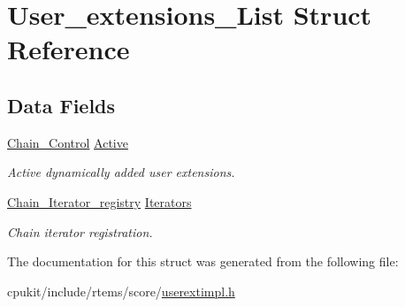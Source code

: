 \hypertarget{structUser__extensions__List}{}\section{User\+\_\+extensions\+\_\+\+List Struct Reference}
\label{structUser__extensions__List}
\subsection*{Data Fields}
\begin{DoxyCompactItemize}
\item 
\mbox{\label{structUser__extensions__List_ad35c5e947d08ba31bc1f32c656ab368f}} 
\mbox{\hyperlink{unionChain__Control}{Chain\+\_\+\+Control}} \mbox{\hyperlink{structUser__extensions__List_ad35c5e947d08ba31bc1f32c656ab368f}{Active}}
\begin{DoxyCompactList}\small\item\em Active dynamically added user extensions. \end{DoxyCompactList}\item 
\mbox{\label{structUser__extensions__List_a45c9f486a1ec2f6f24f2674b9cd5229c}} 
\mbox{\hyperlink{structChain__Iterator__registry}{Chain\+\_\+\+Iterator\+\_\+registry}} \mbox{\hyperlink{structUser__extensions__List_a45c9f486a1ec2f6f24f2674b9cd5229c}{Iterators}}
\begin{DoxyCompactList}\small\item\em Chain iterator registration. \end{DoxyCompactList}\end{DoxyCompactItemize}


The documentation for this struct was generated from the following file\+:\begin{DoxyCompactItemize}
\item 
cpukit/include/rtems/score/\mbox{\hyperlink{userextimpl_8h}{userextimpl.\+h}}\end{DoxyCompactItemize}
